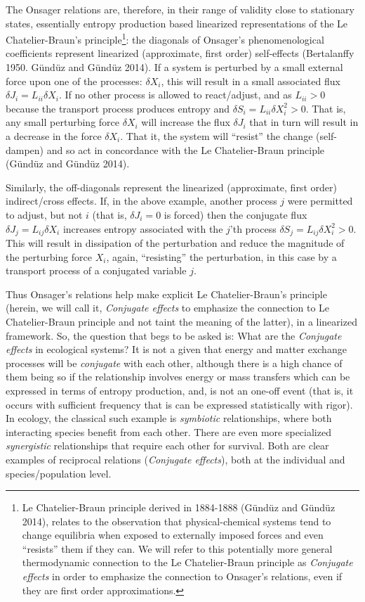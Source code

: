 \documentclass[11pt,letterpaper,]{paper}
\begin{document}
The Onsager relations are, therefore, in their range of validity close
to stationary states, essentially entropy production based linearized
representations of the Le Chatelier-Braun's principle\footnote{Le
  Chatelier-Braun principle derived in 1884-1888 (Gündüz and Gündüz
  2014), relates to the observation that physical-chemical systems tend
  to change equilibria when exposed to externally imposed forces and
  even ``resists'' them if they can. We will refer to this potentially
  more general thermodynamic connection to the Le Chatelier-Braun
  principle as \emph{Conjugate effects} in order to emphasize the
  connection to Onsager's relations, even if they are first order
  approximations.}: the diagonals of Onsager's phenomenological
coefficients represent linearized (approximate, first order)
self-effects (Bertalanffy 1950. Gündüz and Gündüz 2014). If a system is
perturbed by a small external force upon one of the processes:
\(\delta X_i\), this will result in a small associated flux
\(\delta J_i = L_{ii} \delta X_i\). If no other process is allowed to
react/adjust, and as \(L_{ii} > 0\) because the transport process
produces entropy and \(\delta S_i = L_{ii} \delta X_i^2 >0\). That is,
any small perturbing force \(\delta X_i\) will increase the flux
\(\delta J_i\) that in turn will result in a decrease in the force
\(\delta X_i\). That it, the system will ``resist'' the change
(self-dampen) and so act in concordance with the Le Chatelier-Braun
principle (Gündüz and Gündüz 2014).

Similarly, the off-diagonals represent the linearized (approximate,
first order) indirect/cross effects. If, in the above example, another
process \(j\) were permitted to adjust, but not \(i\) (that is,
\(\delta J_i=0\) is forced) then the conjugate flux
\(\delta J_j = L_{ij} \delta X_i\) increases entropy associated with the
\(j\)'th process \(\delta S_j = L_{ij} \delta X_i^2 >0\). This will
result in dissipation of the perturbation and reduce the magnitude of
the perturbing force \(X_i\), again, ``resisting'' the perturbation, in
this case by a transport process of a conjugated variable \(j\).

Thus Onsager's relations help make explicit Le Chatelier-Braun's
principle (herein, we will call it, \emph{Conjugate effects} to
emphasize the connection to Le Chatelier-Braun principle and not taint
the meaning of the latter), in a linearized framework. So, the question
that begs to be asked is: What are the \emph{Conjugate effects} in
ecological systems? It is not a given that energy and matter exchange
processes will be \emph{conjugate} with each other, although there is a
high chance of them being so if the relationship involves energy or mass
transfers which can be expressed in terms of entropy production, and, is
not an one-off event (that is, it occurs with sufficient frequency that
is can be expressed statistically with rigor). In ecology, the classical
such example is \emph{symbiotic} relationships, where both interacting
species benefit from each other. There are even more specialized
\emph{synergistic} relationships that require each other for survival.
Both are clear examples of reciprocal relations (\emph{Conjugate
effects}), both at the individual and species/population level.
\end{document}
